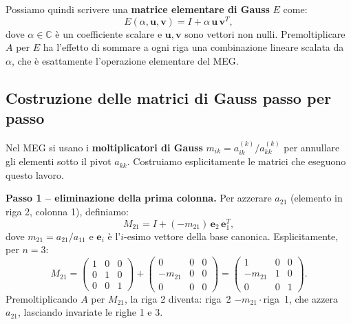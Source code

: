 \documentclass[a4paper,12pt]{article}
\theoremstyle{definition}
\theoremstyle{remark}
\begin{document}
Possiamo quindi scrivere una \textbf{matrice elementare di Gauss} $E$ come:
\[
  E(\alpha, \mathbf{u}, \mathbf{v}) = I + \alpha\,\mathbf{u}\,\mathbf{v}^T,
\]
dove $\alpha \in \mathbb{C}$ è un coefficiente scalare e $\mathbf{u},\mathbf{v}$ sono vettori non
nulli. Premoltiplicare $A$ per $E$ ha l'effetto di sommare a ogni riga una combinazione lineare
scalata da $\alpha$, che è esattamente l'operazione elementare del MEG.

\subsection{Costruzione delle matrici di Gauss passo per passo}

Nel MEG si usano i \textbf{moltiplicatori di Gauss} $m_{ik} = a_{ik}^{(k)}/a_{kk}^{(k)}$ per
annullare gli elementi sotto il pivot $a_{kk}$.  Costruiamo esplicitamente le matrici che eseguono
questo lavoro.

\medskip
\noindent\textbf{Passo 1 -- eliminazione della prima colonna.}
Per azzerare $a_{21}$ (elemento in riga 2, colonna 1), definiamo:
\[
  M_{21} = I + (-m_{21})\,\mathbf{e}_2\,\mathbf{e}_1^T,
\]
dove $m_{21} = a_{21}/a_{11}$ e $\mathbf{e}_i$ è l'$i$-esimo vettore della base canonica.
Esplicitamente, per $n=3$:
\[
  M_{21}
  = \begin{pmatrix} 1 & 0 & 0 \\ 0 & 1 & 0 \\ 0 & 0 & 1 \end{pmatrix}
  + \begin{pmatrix} 0 & 0 & 0 \\ -m_{21} & 0 & 0 \\ 0 & 0 & 0 \end{pmatrix}
  = \begin{pmatrix} 1 & 0 & 0 \\ -m_{21} & 1 & 0 \\ 0 & 0 & 1 \end{pmatrix}.
\]
Premoltiplicando $A$ per $M_{21}$, la riga 2 diventa: riga~2 $- m_{21}\cdot$riga~1, che azzera
$a_{21}$, lasciando invariate le righe 1 e 3.
\end{document}

